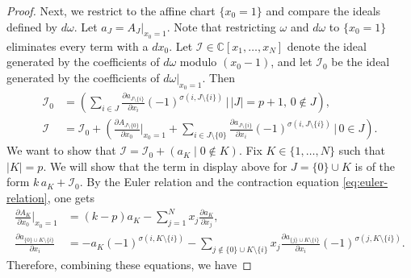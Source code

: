 \documentclass[10pt,a4paper]{amsart}
\newcommand{\CC}{\mathbb{C}}
\newcommand{\cI}{\mathcal{I}}
\begin{document}
\begin{proof}
Next, we restrict to the affine chart $\{x_0 = 1\}$ and compare the ideals defined by $d\omega$. Let $a_J = A_J|_{x_0=1}$. Note that restricting $\omega$ and $d\omega$ to $\{x_0 = 1\}$ eliminates every term with a $dx_0$. Let $\cI\in \CC[x_1, \dots, x_N]$ denote the ideal generated by the coefficients of $d\omega$ modulo $(x_0 -1)$, and let $\cI_0$ be the ideal generated by the coefficients of $d\omega|_{x_0=1}$. Then
\begin{align*}
    \cI_0 &= \left(\sum_{i\in J} \frac{\partial a_{J\setminus \{i\} }}{\partial x_i} (-1)^{\sigma(i,J\setminus \{i\})}  \,\Big|\, |J| = p+1 , \, 0 \not\in J  \right), \\
    \cI &= \cI_0 + \left(\frac{\partial A_{J\setminus \{0\} }}{\partial x_0}\Big|_{x_0= 1} + \sum_{i\in J \setminus \{0\}} \frac{\partial a_{J\setminus \{i\} }}{\partial x_i} (-1)^{\sigma(i,J\setminus \{i\})} \,\Big|\, 0 \in J  \right).
\end{align*}
We want to show that $\cI = \cI_0 + (a_K \mid 0\not\in K)$. Fix $K\in \{1, \dots , N\}$ such that $|K|=p$. We will show that the term in display above for $J = \{0\}\cup K$ is of the form $k\,a_K + \cI_0$. By the Euler relation and the contraction equation \eqref{eq:euler-relation}, one gets
\begin{align*}
    \frac{\partial A_{K}}{\partial x_0}\Big|_{x_0= 1} & = (k-p)a_K -\sum_{j=1}^N x_j\frac{\partial a_{K}}{\partial x_j} ,\\
    \frac{\partial a_{\{0\} \cup K  \setminus \{i\} }}{\partial x_i} &= -a_K(-1)^{\sigma(i,K \setminus \{i\})} - \sum_{j \not\in \{0\} \cup K\setminus \{i\}} x_j\frac{\partial a_{\{j\} \cup K\setminus \{i\}}}{\partial x_i}(-1)^{\sigma(j,K\setminus \{i\})}.
\end{align*}
Therefore, combining these equations, we have

\end{proof}
\end{document}
